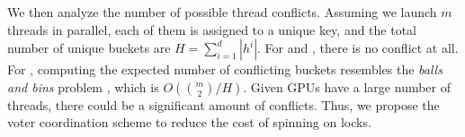 We then analyze the number of possible thread conflicts. Assuming we launch $m$ threads in parallel, each of them is assigned to a unique key, and the total number of unique buckets are $H=\sum_{i=1}^d|h^i|$. For  and , there is no conflict at all. 
For , computing the expected number of conflicting buckets resembles the \emph{balls and bins} problem \cite{raab1998balls}, which is $O(\binom{m}{2}/H)$. 
Given GPUs have a large number of threads, there could be a significant amount of conflicts. Thus, we propose the voter coordination scheme to reduce the cost of spinning on locks. 
